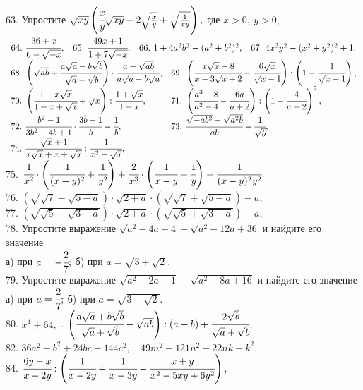 63. Упростите $\sqrt{xy}\left(\cfrac{x}{y}\sqrt{xy}-2\sqrt{\frac{x}{y}}+\sqrt{\frac{1}{xy}}\right),$ где $x>0,\ y>0,$\\
$\begin{array}{llll}
64.\ \cfrac{36+x}{6-\sqrt{-x}},&
65.\ \cfrac{49x+1}{1+7\sqrt{-x}},&
66.\ 1+4a^2b^2-(a^2+b^2)^2,&
67.\ 4x^2y^2-(x^2+y^2)^2+1,
\end{array}$\\
$\begin{array}{llll}
68.\ \left(\sqrt{ab}+\cfrac{a\sqrt{a}-b\sqrt{b}}{\sqrt{a}-\sqrt{b}}\right)\cdot\cfrac{a-\sqrt{ab}}{
a\sqrt{a}-b\sqrt{a}},&
69.\ \left(\cfrac{x\sqrt{x}-8}{x-3\sqrt{x}+2}-\cfrac{6\sqrt{x}}{\sqrt{x}-1}\right):
\left(1-\cfrac{1}{\sqrt{x}-1}\right),\\
70.\ \left(\cfrac{1-x\sqrt{x}}{1+x+\sqrt{x}}+\sqrt{x}\right): \cfrac{1+\sqrt{x}}{1-x},&
71.\ \left(\cfrac{a^3-8}{a^2-4}-\cfrac{6a}{a+2}\right): \left(1-\cfrac{4}{a+2}\right)^2,\\
72.\ \cfrac{b^2-1}{3b^2-4b+1}\cdot\cfrac{3b-1}{b}-\cfrac{1}{b},&
73.\ \cfrac{\sqrt{-ab^2}-\sqrt{a^2b}}{ab}-\cfrac{1}{\sqrt{b}},\\
74.\ \cfrac{\sqrt{x}+1}{x\sqrt{x}+x+\sqrt{x}}:\cfrac{1}{x^2-\sqrt{x}},\end{array}$\\
75. $\cfrac{1}{x^2}\cdot\left(\cfrac{1}{(x-y)^2}+\cfrac{1}{y^2}\right)+\cfrac{2}{x^3}\cdot\left(
\cfrac{1}{x-y}+\cfrac{1}{y}\right)-\cfrac{1}{(x-y)^2y^2}.$\\
76. $\left(\sqrt{\sqrt{7}-\sqrt{5-a}}\right)\cdot\sqrt{2+a}\cdot\left(\sqrt{\sqrt{7}+\sqrt{5-a}}\right)-a,$\\
77. $\left(\sqrt{\sqrt{5}-\sqrt{3-a}}\right)\cdot\sqrt{2+a}\cdot\left(\sqrt{\sqrt{5}+\sqrt{3-a}}\right)-a,$\\
78. Упростите выражение $\sqrt{a^2-4a+4}+\sqrt{a^2-12a+36}$ и найдите его значение\\
а) при $a=-\cfrac{2}{7};$ б) при $a=\sqrt{3+\sqrt{2}}.$\\
79. Упростите выражение $\sqrt{a^2-2a+1}+\sqrt{a^2-8a+16}$ и найдите его значение\\
а) при $a=\cfrac{2}{7};$ б) при $a=\sqrt{3-\sqrt{2}}.$\\
80. $x^4+64,$ \qquad {}. $\left(\cfrac{a\sqrt{a}+b\sqrt{b}}{\sqrt{a}+\sqrt{b}}-\sqrt{ab}\right):(a-b)+\cfrac{2\sqrt{b}}{\sqrt{a}+\sqrt{b}},$\\
82. $36a^2-b^2+24bc-144c^2,$ \qquad {}. $49m^2-121n^2+22nk-k^2,$\\
84. $\cfrac{6y-x}{x-2y}:\left(\cfrac{1}{x-2y}+\cfrac{1}{x-3y}-\cfrac{x+y}{x^2-5xy+6y^2}\right),$
